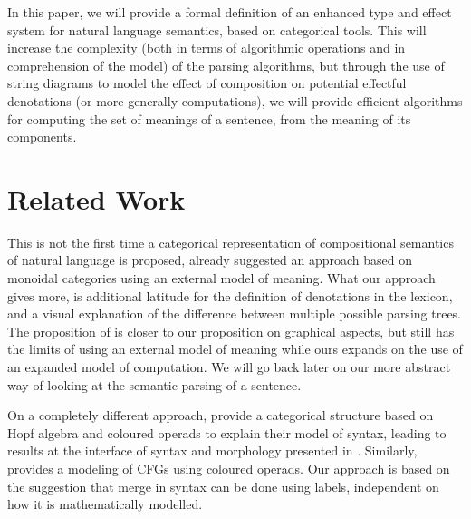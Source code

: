 \documentclass[a4paper,UKenglish,cleveref, autoref, thm-restate, anonymous]{lipics-v2021}
\begin{document}
\smallskip

In this paper, we will provide a formal definition of an enhanced type and
effect system for natural language semantics, based on categorical tools.
This will increase the complexity (both in terms of algorithmic operations and
in comprehension of the model) of the parsing algorithms, but through the use
of string diagrams to model the effect of composition on potential effectful
denotations (or more generally computations), we will provide efficient
algorithms for computing the set of meanings of a sentence, from the meaning of
its components.

\section{Related Work}
This is not the first time a categorical representation of compositional
semantics of natural language is proposed,
\cite{coeckeMathematicalFoundationsCompositional2010} already suggested an
approach based on monoidal categories using an external model of meaning.
What our approach gives more, is additional latitude for the definition of
denotations in the lexicon, and a visual explanation of the difference between
multiple possible parsing trees.
The proposition of \cite{toumiHigherOrderDisCoCatPeirceLambekMontague2023} is
closer to our proposition on graphical aspects, but still has the limits of
using an external model of meaning while ours expands on the use of an expanded
model of computation.
We will go back later on our more abstract way of looking at the semantic
parsing of a sentence.

\smallskip

On a completely different approach,
\cite{marcollimatildeetchomskynoametberwickrobertc.MathematicalStructureSyntactic}
provide a categorical structure based on Hopf algebra and coloured operads
to explain their model of syntax, leading to results at the interface of syntax
and morphology presented in \cite{senturiaAlgebraicStructureMorphosyntax2025}.
Similarly, \cite{melliesCategoricalContoursChomskySchutzenberger2025} provides
a modeling of CFGs using coloured operads.
Our approach is based on the suggestion that merge in syntax can be done using
labels, independent on how it is mathematically modelled.






\end{document}
